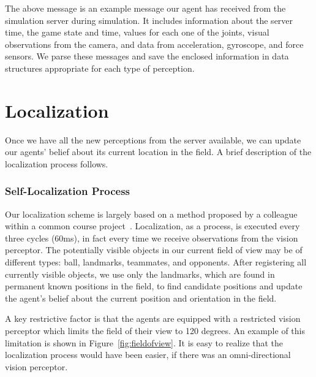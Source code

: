 \noindent
The above message is an example message our agent has received from the simulation server during simulation. It includes information about the server time, the game state and time, values for each one of the joints, visual observations from the camera, and data from acceleration, gyroscope, and force sensors. We parse these messages and save the enclosed information in data structures appropriate for each type of perception. 



\section{Localization}
Once we have all the new perceptions from the server available, we can update our agents' belief about its current location in the field. A brief description of the localization process follows.

\subsubsection*{Self-Localization Process} 

Our localization scheme is largely based on a method proposed by a colleague within a common course project~\cite{Localization}. Localization, as a process, is executed every three cycles (60ms), in fact every time we receive observations from the vision perceptor. The potentially visible objects in our current field of view may be of different types: ball, landmarks, teammates, and opponents. After registering all currently visible objects, we use only the landmarks, which are found in permanent known positions in the field, to find candidate positions and update the agent's belief about the current position and orientation in the field. 

A key restrictive factor is that the agents are equipped with a restricted vision perceptor which limits the field of their view to 120 degrees. An example of this limitation is shown in Figure~\ref{fig:fieldofview}. It is easy to realize that the localization process would have been easier, if there was an omni-directional vision perceptor.

